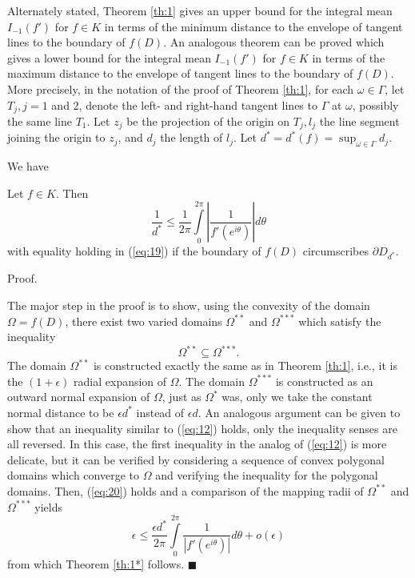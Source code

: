 Alternately stated, Theorem \ref{th:1} gives an upper bound for the
integral mean $I_{-1}(f')$ for $f\in K$ in terms of the minimum
distance to the envelope of tangent lines to the boundary of $f(D)$.
An analogous theorem can be proved which gives a lower bound for the
integral mean $I_{-1}(f')$ for $f\in K$ in terms of the maximum
distance to the envelope of tangent lines to the boundary of $f(D)$.
More precisely, in the notation of the proof of Theorem \ref{th:1},
for each $\omega \in \Gamma$, let $T_j, j=1$ and 2, denote the left-
and right-hand tangent lines to $\Gamma$ at $\omega$, possibly the
same line $T_1$.  Let $z_j$ be the projection of the origin on $T_j,
l_j$ the line segment joining the origin to $z_j$, and $d_j$ the
length of $l_j$.  Let $d^\ast
=d^\ast(f)=\displaystyle{\sup_{\omega\in \Gamma} d_j}$.  

We have


\setcounter{section}{1}


\renewcommand{\thetheorem}{{\arabic{section}}{\fnsymbol{theorem}}}
\setcounter{theorem}{0}

\begin{theorem}\label{th:1*}
Let $f\in K$.  Then
\begin{equation}
\label{eq:19}
\frac{1}{d^\ast} \leq \frac{1}{2\pi} \int\limits^{2\pi}_0 \left|
\frac{1}{f'(e^{i\theta})} \right| d\theta
\end{equation}
with equality holding in {\rm (\ref{eq:19})} if the boundary of $f(D)$
circumscribes $\partial D_{d^\ast}$. 
\end{theorem}

\noindent Proof.

The major step in the proof is to show, using the convexity of the
domain $\Omega=f(D)$, there exist two varied domains
$\Omega^{\ast\ast}$ and $\Omega^{\ast\ast\ast}$  which satisfy the
inequality
\begin{equation}
\label{eq:20}
\Omega^{\ast\ast} \subseteq \Omega^{\ast\ast\ast}.
\end{equation}
The domain $\Omega^{\ast\ast}$ is constructed exactly the same as in
Theorem \ref{th:1}, i.e., it is the $(1+\epsilon)$ radial expansion
of $\Omega$.  The domain $\Omega^{\ast\ast\ast}$ is constructed as an
outward normal expansion of $\Omega$, just as $\Omega^\ast$ was, only
we take the constant normal distance to be $\epsilon d^\ast$ instead
of $\epsilon d$.  An analogous argument can be given to show that an
inequality similar to (\ref{eq:12}) holds, only the inequality senses
are all reversed.  In this case, the first inequality in the analog
of (\ref{eq:12}) is more delicate, but it can be verified by
considering a sequence of convex polygonal domains which converge to
$\Omega$ and verifying the inequality for the polygonal domains.
Then, (\ref{eq:20}) holds and a comparison of the mapping radii of
$\Omega^{\ast\ast}$ and $\Omega^{\ast\ast\ast}$ yields 
$$\epsilon \leq \frac{\epsilon d^\ast}{2\pi} \int\limits^{2\pi}_0
\frac{1}{|f' (e^{i\theta})|} d\theta+o (\epsilon)$$
from which Theorem \ref{th:1*} follows. \hfill $\blacksquare$

